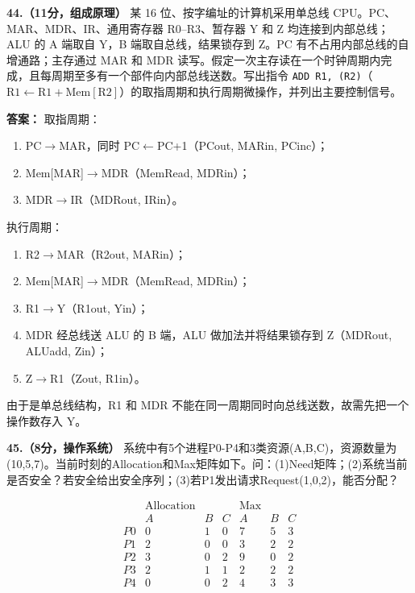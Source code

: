 \vspace{8pt}

\noindent\textbf{44.（11分，组成原理）} 某 16 位、按字编址的计算机采用单总线 CPU。PC、MAR、MDR、IR、通用寄存器 R0--R3、暂存器 Y 和 Z 均连接到内部总线；ALU 的 A 端取自 Y，B 端取自总线，结果锁存到 Z。PC 有不占用内部总线的自增通路；主存通过 MAR 和 MDR 读写。假定一次主存读在一个时钟周期内完成，且每周期至多有一个部件向内部总线送数。写出指令 \texttt{ADD R1, (R2)}（$\mathrm{R1}\gets\mathrm{R1}+\mathrm{Mem[R2]}$）的取指周期和执行周期微操作，并列出主要控制信号。

\ifshowsolutions\par\noindent\textbf{答案：}
取指周期：
\begin{enumerate}[label=T$\arabic*$:,leftmargin=*]
    \item PC$\to$MAR，同时 PC$\gets$PC+1（PCout, MARin, PCinc）；
    \item Mem[MAR]$\to$MDR（MemRead, MDRin）；
    \item MDR$\to$IR（MDRout, IRin）。
\end{enumerate}
执行周期：
\begin{enumerate}[label=T$\arabic*$:,leftmargin=*]
    \item R2$\to$MAR（R2out, MARin）；
    \item Mem[MAR]$\to$MDR（MemRead, MDRin）；
    \item R1$\to$Y（R1out, Yin）；
    \item MDR 经总线送 ALU 的 B 端，ALU 做加法并将结果锁存到 Z（MDRout, ALUadd, Zin）；
    \item Z$\to$R1（Zout, R1in）。
\end{enumerate}
由于是单总线结构，R1 和 MDR 不能在同一周期同时向总线送数，故需先把一个操作数存入 Y。\else \answerarea[8] \fi

\vspace{8pt}

\noindent\textbf{45.（8分，操作系统）} 系统中有5个进程P0-P4和3类资源(A,B,C)，资源数量为(10,5,7)。当前时刻的Allocation和Max矩阵如下。问：(1)Need矩阵；(2)系统当前是否安全？若安全给出安全序列；(3)若P1发出请求Request(1,0,2)，能否分配？

\[
\begin{array}{c|ccc|ccc}
 & \text{Allocation} & & & \text{Max} & \\
 & A & B & C & A & B & C \\
\hline
P0 & 0 & 1 & 0 & 7 & 5 & 3 \\
P1 & 2 & 0 & 0 & 3 & 2 & 2 \\
P2 & 3 & 0 & 2 & 9 & 0 & 2 \\
P3 & 2 & 1 & 1 & 2 & 2 & 2 \\
P4 & 0 & 0 & 2 & 4 & 3 & 3 \\
\end{array}
\]

